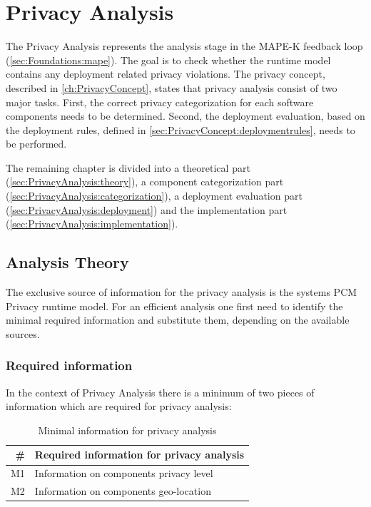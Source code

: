 \chapter{Privacy Analysis}
\label{ch:PrivacyAnalysis}

The Privacy Analysis represents the analysis stage in the MAPE-K feedback loop (\autoref{sec:Foundations:mape}). The goal is to check whether the runtime model contains any deployment related privacy violations. The privacy concept, described in \autoref{ch:PrivacyConcept}, states that privacy analysis consist of two major tasks. First, the correct privacy categorization for each software components needs to be determined. Second, the deployment evaluation, based on the deployment rules, defined in \autoref{sec:PrivacyConcept:deploymentrules}, needs to be performed.

The remaining chapter is divided into a theoretical part (\autoref{sec:PrivacyAnalysis:theory}), a component categorization part (\autoref{sec:PrivacyAnalysis:categorization}), a deployment evaluation part (\autoref{sec:PrivacyAnalysis:deployment}) and the implementation part (\autoref{sec:PrivacyAnalysis:implementation}).


\section{Analysis Theory}
\label{sec:PrivacyAnalysis:theory}

The exclusive source of information for the privacy analysis is the systems PCM Privacy runtime model. For an efficient analysis one first need to identify the minimal required information and substitute them, depending on the available sources.


\subsection{Required information}
In the context of Privacy Analysis there is a minimum of two pieces of information which are required for privacy analysis:

\begin{table}[h]
	\centering
	\begin{tabular}{r | l}
		\hline
		\textbf{\#} & \textbf{Required information for privacy analysis}\\
		\hline
		M1 & Information on components privacy level \\
		M2 & Information on components geo-location \\
		\hline
	\end{tabular}
	\caption{Minimal information for privacy analysis}
	\label{tab:pa_minimal_info}
\end{table}

